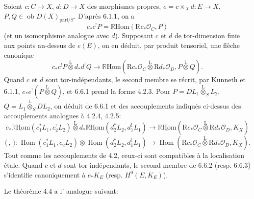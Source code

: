 \documentclass[11pt]{article}
\providecommand{\cO}{\mathcal{O}}
\DeclareMathOperator{\Hom}{Hom}
\newcommand{\R}{\mathbb{R}}\newcommand{\RHomCore}{\mathbb{R}\mathrm{Hom}}
\providecommand{\RHom}{\RHomCore}
\providecommand{\uRHom}{\underline{\RHom}}
\providecommand{\RHom}{\RHomCore}
\providecommand{\Hom}{\operatorname{Hom}}
\providecommand{\RHom}{\R\mathcal{H}om}
\providecommand{\R}{\mathrm R}
\providecommand{\RHom}{\RHomCore}
\providecommand{\Hom}{\operatorname{Hom}}
\begin{document}
Soient $c:C\to X$, $d:D\to X$ des morphismes propres, $e=c\times_Xd:E\to X$, $P,Q\in\operatorname{ob}D(X)_{\mathrm{parf}/S}$. D'après 6.1.1, on a
\[
c_*c^!P=\uRHom(\mathrm{R}c_*\cO_C,P)
\]
(et un isomorphisme analogue avec $d$). Supposant $c$ et $d$ de tor-dimension finie aux points au-dessus de $e(E)$, on en déduit, par produit tensoriel, une flèche canonique
\begin{equation}
\tag{6.6.1}
c_*c^!P\overset{\mathrm{L}}{\otimes}d_*d^!Q\longrightarrow
\uRHom(\mathrm{R}c_*\cO_C\overset{\mathrm{L}}{\otimes}\mathrm{R}d_*\cO_D,P\overset{\mathrm{L}}{\otimes}Q).
\end{equation}
Quand $c$ et $d$ sont tor-indépendants, le second membre se récrit, par Künneth et 6.1.1, $e_*e^!(P\overset{\mathrm{L}}{\otimes}Q)$, et 6.6.1 prend la forme 4.2.3. Pour $P=DL_1\overset{\mathrm{L}}{\otimes}_SL_2$, $Q=L_1\overset{\mathrm{L}}{\otimes}_SDL_2$, on déduit de 6.6.1 et des accouplements indiqués ci-dessus des accouplements analogues à 4.2.4, 4.2.5:
\begin{equation}
\tag{6.6.2}
c_*\uRHom(c_1^*L_1,c_2^!L_2)\overset{\mathrm{L}}{\otimes}d_*\uRHom(d_2^*L_2,d_1^!L_1)
\longrightarrow\uRHom(\mathrm{R}c_*\cO_C\overset{\mathrm{L}}{\otimes}\mathrm{R}d_*\cO_D,K_X)
\end{equation}
\begin{equation}
\tag{6.6.3}
\langle\ ,\ \rangle:\Hom(c_1^*L_1,c_2^!L_2)\otimes\Hom(d_2^*L_2,d_1^!L_1)
\longrightarrow\Hom(\mathrm{R}c_*\cO_C\overset{\mathrm{L}}{\otimes}\mathrm{R}d_*\cO_D,K_X).
\end{equation}
Tout comme les accouplements de 4.2, ceux-ci sont compatibles à la localisation étale. Quand $c$ et $d$ sont tor-indépendants, le second membre de 6.6.2 (resp. 6.6.3) s'identifie canoniquement à $e_*K_E$ (resp. $H^0(E,K_E)$).

Le théorème 4.4 a l'%
analogue suivant:
\end{document}
